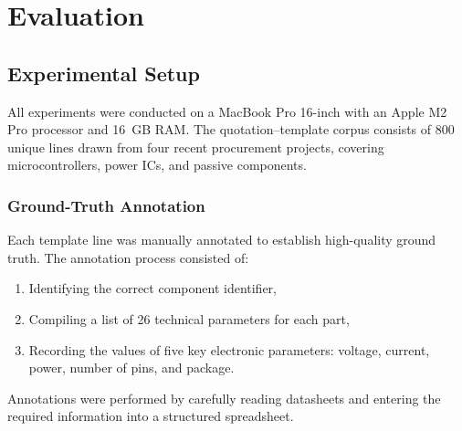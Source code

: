 \chapter{Evaluation}
\label{chapter:evaluation}

\section{Experimental Setup}
All experiments were conducted on a MacBook Pro 16-inch with an Apple M2 Pro processor and 16~GB RAM. The quotation–template corpus consists of 800 unique lines drawn from four recent procurement projects, covering microcontrollers, power ICs, and passive components.

\subsection{Ground-Truth Annotation}
Each template line was manually annotated to establish high-quality ground truth. The annotation process consisted of:
\begin{enumerate}
  \item Identifying the correct component identifier,
  \item Compiling a list of 26 technical parameters for each part,
  \item Recording the values of five key electronic parameters: voltage, current, power, number of pins, and package.
\end{enumerate}
Annotations were performed by carefully reading datasheets and entering the required information into a structured spreadsheet.


